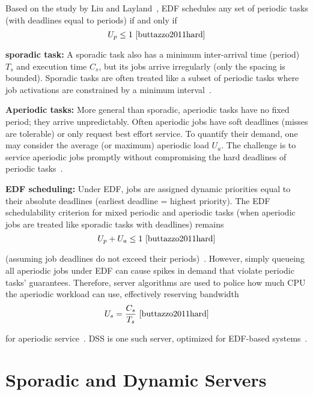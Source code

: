 \documentclass[conference]{IEEEtran}
\begin{document}
Based on the study by Liu and Layland~\cite{liu1973scheduling}, EDF schedules any set of periodic tasks (with deadlines equal to periods) if and only if 
\[
U_p \leq 1
\ \cite{buttazzo2011hard} \]

\textbf{sporadic task:} A sporadic task also has a minimum inter-arrival time (period) $T_s$ and execution time $C_s$, but its jobs arrive irregularly (only the spacing is bounded). Sporadic tasks are often treated like a subset of periodic tasks where job activations are constrained by a minimum interval~\cite{buttazzo2011hard}.

\textbf{Aperiodic tasks:} More general than sporadic, aperiodic tasks have no fixed period; they arrive unpredictably. Often aperiodic jobs have soft deadlines (misses are tolerable) or only request best effort service. To quantify their demand, one may consider the average (or maximum) aperiodic load $U_a$. The challenge is to service aperiodic jobs promptly without compromising the hard deadlines of periodic tasks~\cite{buttazzo2011hard}.

\textbf{EDF scheduling:} Under EDF, jobs are assigned dynamic priorities equal to their absolute deadlines (earliest deadline = highest priority). The EDF schedulability criterion for mixed periodic and aperiodic tasks (when aperiodic jobs are treated like sporadic tasks with deadlines) remains
\[
U_p + U_a \leq 1
\ \cite{buttazzo2011hard} \]

(assuming job deadlines do not exceed their periods)~\cite{spuri1994efficient}. However, simply queueing all aperiodic jobs under EDF can cause spikes in demand that violate periodic tasks' guarantees. Therefore, server algorithms are used to police how much CPU the aperiodic workload can use, effectively reserving bandwidth
\[
U_s = \frac{C_s}{T_s}
\ \cite{buttazzo2011hard} \] 

for aperiodic service~\cite{buttazzo2011hard}. DSS is one such server, optimized for EDF-based systems~\cite{buttazzo2011hard}.

\section{Sporadic and Dynamic Servers}
\end{document}
